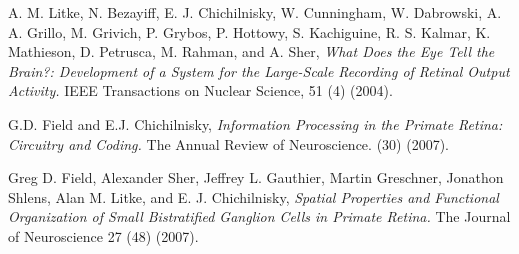 \documentclass[10pt]{article}
\begin{document}
\begin{thebibliography}{1}
			 
		

	 A. M. Litke, N. Bezayiff, E. J. Chichilnisky, W. Cunningham, W. Dabrowski, A. A. Grillo, M. Grivich, P. Grybos,
P. Hottowy, S. Kachiguine, R. S. Kalmar, K. Mathieson, D. Petrusca, M. Rahman, and A. Sher,
	\textit{What Does the Eye Tell the Brain?: Development of a System for the Large-Scale Recording of Retinal Output Activity.}
	IEEE Transactions on Nuclear Science, 51 (4) (2004). 


	 G.D. Field and E.J. Chichilnisky,
	\textit{Information Processing in the Primate Retina: Circuitry and Coding.}
	The Annual Review of Neuroscience. (30) (2007).
			 
			 			 
	 Greg D. Field, Alexander Sher, Jeffrey L. Gauthier, Martin Greschner, Jonathon Shlens, Alan M. Litke, and E. J. Chichilnisky,
	\textit{ Spatial Properties and Functional Organization of Small Bistratified Ganglion Cells in Primate Retina.}
	The Journal of Neuroscience 27 (48) (2007). 
			 
\end{thebibliography}



%
%
\end{document}
